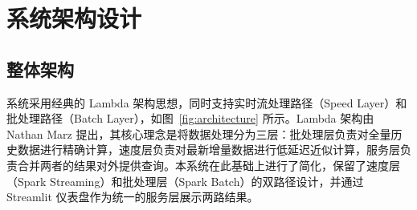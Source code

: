 \documentclass[12pt,a4paper]{article}
\begin{document}
\section{系统架构设计}

\subsection{整体架构}

系统采用经典的 Lambda 架构思想，同时支持实时流处理路径（Speed Layer）和批处理路径（Batch Layer），如图~\ref{fig:architecture} 所示。Lambda 架构由 Nathan Marz 提出，其核心理念是将数据处理分为三层：批处理层负责对全量历史数据进行精确计算，速度层负责对最新增量数据进行低延迟近似计算，服务层负责合并两者的结果对外提供查询。本系统在此基础上进行了简化，保留了速度层（Spark Streaming）和批处理层（Spark Batch）的双路径设计，并通过 Streamlit 仪表盘作为统一的服务层展示两路结果。
\end{document}
